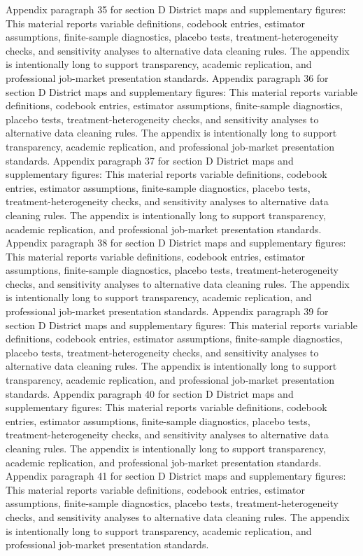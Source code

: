\documentclass[preprint,12pt]{elsarticle}
\begin{document}
Appendix paragraph 35 for section D District maps and supplementary figures: This material reports variable definitions, codebook entries, estimator assumptions, finite-sample diagnostics, placebo tests, treatment-heterogeneity checks, and sensitivity analyses to alternative data cleaning rules. The appendix is intentionally long to support transparency, academic replication, and professional job-market presentation standards.
Appendix paragraph 36 for section D District maps and supplementary figures: This material reports variable definitions, codebook entries, estimator assumptions, finite-sample diagnostics, placebo tests, treatment-heterogeneity checks, and sensitivity analyses to alternative data cleaning rules. The appendix is intentionally long to support transparency, academic replication, and professional job-market presentation standards.
Appendix paragraph 37 for section D District maps and supplementary figures: This material reports variable definitions, codebook entries, estimator assumptions, finite-sample diagnostics, placebo tests, treatment-heterogeneity checks, and sensitivity analyses to alternative data cleaning rules. The appendix is intentionally long to support transparency, academic replication, and professional job-market presentation standards.
Appendix paragraph 38 for section D District maps and supplementary figures: This material reports variable definitions, codebook entries, estimator assumptions, finite-sample diagnostics, placebo tests, treatment-heterogeneity checks, and sensitivity analyses to alternative data cleaning rules. The appendix is intentionally long to support transparency, academic replication, and professional job-market presentation standards.
Appendix paragraph 39 for section D District maps and supplementary figures: This material reports variable definitions, codebook entries, estimator assumptions, finite-sample diagnostics, placebo tests, treatment-heterogeneity checks, and sensitivity analyses to alternative data cleaning rules. The appendix is intentionally long to support transparency, academic replication, and professional job-market presentation standards.
Appendix paragraph 40 for section D District maps and supplementary figures: This material reports variable definitions, codebook entries, estimator assumptions, finite-sample diagnostics, placebo tests, treatment-heterogeneity checks, and sensitivity analyses to alternative data cleaning rules. The appendix is intentionally long to support transparency, academic replication, and professional job-market presentation standards.
Appendix paragraph 41 for section D District maps and supplementary figures: This material reports variable definitions, codebook entries, estimator assumptions, finite-sample diagnostics, placebo tests, treatment-heterogeneity checks, and sensitivity analyses to alternative data cleaning rules. The appendix is intentionally long to support transparency, academic replication, and professional job-market presentation standards.
\end{document}
